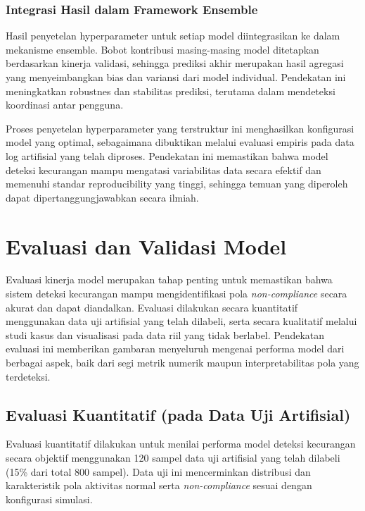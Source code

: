 \subsubsection{Integrasi Hasil dalam Framework Ensemble}
Hasil penyetelan hyperparameter untuk setiap model diintegrasikan ke dalam mekanisme ensemble. Bobot kontribusi masing-masing model ditetapkan berdasarkan kinerja validasi, sehingga prediksi akhir merupakan hasil agregasi yang menyeimbangkan bias dan variansi dari model individual. Pendekatan ini meningkatkan robustnes dan stabilitas prediksi, terutama dalam mendeteksi koordinasi antar pengguna.

Proses penyetelan hyperparameter yang terstruktur ini menghasilkan konfigurasi model yang optimal, sebagaimana dibuktikan melalui evaluasi empiris pada data log artifisial yang telah diproses. Pendekatan ini memastikan bahwa model deteksi kecurangan mampu mengatasi variabilitas data secara efektif dan memenuhi standar reproducibility yang tinggi, sehingga temuan yang diperoleh dapat dipertanggungjawabkan secara ilmiah.

\section{Evaluasi dan Validasi Model}
\label{sec:strategiEvaluasiKinerjaModel}
Evaluasi kinerja model merupakan tahap penting untuk memastikan bahwa sistem deteksi kecurangan mampu mengidentifikasi pola \textit{non-compliance} secara akurat dan dapat diandalkan. Evaluasi dilakukan secara kuantitatif menggunakan data uji artifisial yang telah dilabeli, serta secara kualitatif melalui studi kasus dan visualisasi pada data riil yang tidak berlabel. Pendekatan evaluasi ini memberikan gambaran menyeluruh mengenai performa model dari berbagai aspek, baik dari segi metrik numerik maupun interpretabilitas pola yang terdeteksi.

\subsection{Evaluasi Kuantitatif (pada Data Uji Artifisial)}
\label{sec:evaluasiKuantitatifDataUjiArtifisial}
Evaluasi kuantitatif dilakukan untuk menilai performa model deteksi kecurangan secara objektif menggunakan 120 sampel data uji artifisial yang telah dilabeli (15\% dari total 800 sampel). Data uji ini mencerminkan distribusi dan karakteristik pola aktivitas normal serta \textit{non-compliance} sesuai dengan konfigurasi simulasi. 

